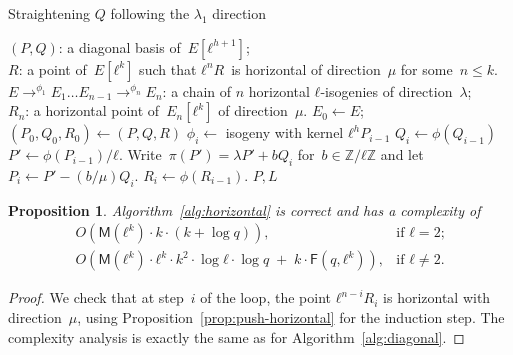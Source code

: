\documentclass{lms}
\newtheorem{prop}[thm]{Proposition}
\def\pa#1{\left(#1\right)}
\def\cout#1{\mathsf{#1}}
\begin{document}
\begin{algorithm}
\caption{\label{alg:horizontal}Straightening $Q$ following the $\lambda_1$ direction}
\begin{algorithmic}[1]
\REQUIRE $(P, Q)$: a diagonal basis of~$E[ℓ^{h+1}]$;\\
$R$: a point of~$E[ℓ^k]$ such that
$ℓ^n R$~is horizontal of direction~$μ$ for some~$n ≤ k$.
\ENSURE $E →^{ϕ_1} E_{1} … E_{n-1} →^{ϕ_n} E_n$:
a chain of $n$ horizontal $ℓ$-isogenies of direction~$λ$;\\
$R_n$: a horizontal point of~$E_{n}[ℓ^{k}]$ of direction~$μ$.
\STATE $E_0 \gets E$; $(P_0, Q_0, R_0) \gets (P, Q, R)$
\STATE $ϕ_i\gets $ isogeny with kernel ${ℓ^h P_{i-1}}$
\STATE $Q_{i} \gets ϕ(Q_{i-1})$
\STATE $P' \gets ϕ(P_{i-1})/ℓ$.
\STATE Write~$π(P') = λ P' + b Q_i$ for~$b ∈ ℤ/ℓℤ$ and
let $P_{i} \gets P' - (b/μ) Q_i$.
\STATE $R_i \gets ϕ(R_{i-1})$.
\ENDFOR
\RETURN $P,L$
\end{algorithmic}
\end{algorithm}
\begin{prop}
Algorithm~\ref{alg:horizontal} is correct and has a complexity of
\begin{equation*}
\begin{array}{ll}
O\pa{\cout{M}(ℓ^k) · k · (k + \log q)}, &\text{if $ℓ = 2$;}\\
O\pa{\cout{M}(ℓ^k) · ℓ^k · k^2 · \log ℓ · \log q
  \;+\; k · \cout{F}(q, ℓ^k)}, &\text{if $ℓ ≠ 2$.}
\end{array}
\end{equation*}
\end{prop}
%  
\begin{proof}
We check that at step~$i$ of the loop,
the point $ℓ^{n-i} R_i$ is horizontal with direction~$μ$,
using Proposition~\ref{prop:push-horizontal} for the induction step.
The complexity analysis %
is exactly the same as for Algorithm~\ref{alg:diagonal}.
\end{proof}
\end{document}
